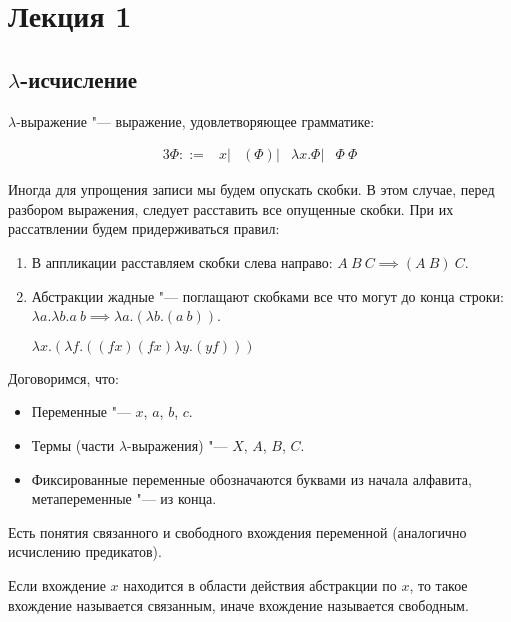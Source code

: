 \section{Лекция 1}

\subsection{$\lambda$-исчисление}

\begin{definition}
	$\lambda$-выражение "--- выражение, удовлетворяющее грамматике:
	\begin{bnf}
	\begin{alignat*}{3}
		\Phi ::= & x
		       | & \left(\Phi\right) 
		       | & \lambda{}x.\Phi 
		       | & \Phi \ \Phi        
	\end{alignat*}
	\end{bnf}
\end{definition}

Иногда для упрощения записи мы будем опускать скобки. В этом случае, перед разбором выражения, следует расставить все опущенные скобки. При их рассатвлении будем придерживаться правил:
\begin{enumerate}
	\item В аппликации расставляем скобки слева направо: $A \ B \ C \implies (A \ B) \ C$.
	\item Абстракции жадные "--- поглащают скобками все что могут до конца строки: 
	$\lambda{}a.\lambda{}b.a \ b \implies \lambda{}a.(\lambda{}b.(a \ b))$.
	\vspace{1mm}
	\begin{example}
		$\lambda{}x.(\lambda{}f.((f x) (f x) \lambda{}y.(y f)))$
	\end{example}
\end{enumerate}

Договоримся, что:
\begin{itemize}
	\item Переменные "--- $x$, $a$, $b$, $c$.
	\item Термы (части $\lambda$-выражения) "--- $X$, $A$, $B$, $C$.
	\item Фиксированные переменные обозначаются буквами из начала алфавита, метапеременные "--- из конца.
\end{itemize}

Есть понятия связанного и свободного вхождения переменной (аналогично исчислению предикатов).

\begin{definition}
	Если вхождение $x$ находится в области действия абстракции по $x$, то такое вхождение называется связанным, иначе вхождение называется свободным.
\end{definition}


